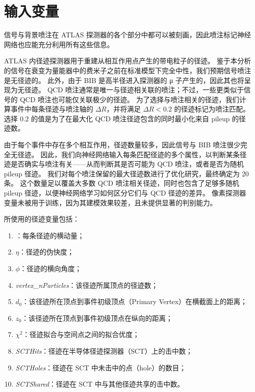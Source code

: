 \section{输入变量}
\label{cpm:NN_variables}

信号与背景喷注在 ATLAS 探测器的各个部分中都可以被刻画，因此喷注标记神经网络也应能充分利用所有这些信息。

ATLAS 内径迹探测器用于重建从相互作用点产生的带电粒子的径迹。
鉴于本分析的信号在衰变为量能器中的费米子之前在标准模型下完全中性，我们预期信号喷注是无径迹的。
此外，由于 BIB 是高半径进入探测器的 μ 子产生的，因此其也将呈现为无径迹。
QCD 喷注通常是唯一与径迹相关联的喷注；不过，一些更类似于信号的 QCD 喷注也可能仅关联极少的径迹。
为了选择与喷注相关的径迹，我们计算事件中每条径迹与喷注轴的 $\Delta R$，并将满足 $\Delta R < 0.2$ 的径迹标记为喷注匹配。
选择 $0.2$ 的值是为了在最大化 QCD 喷注径迹包含的同时最小化来自 pileup 的径迹数。

由于每个事件中存在多个相互作用，径迹数量较多，因此信号与 BIB 喷注很少完全无径迹。
因此，我们向神经网络输入每条匹配径迹的多个属性，以判断某条径迹是否确实与喷注有关——从而判断其是否可能为 QCD 喷注，或者是否为随机 pileup 径迹。
我们对每个喷注保留的最大径迹数进行了优化研究，最终确定为 20 条。
这个数量足以覆盖大多数 QCD 喷注相关径迹，同时也包含了足够多随机 pileup 径迹，以便神经网络学习如何区分它们与 QCD 径迹的差异。
像素探测器变量未被用于训练，因为其建模效果较差，且未提供显著的判别能力。

所使用的径迹变量包括：
\begin{enumerate}
      \item \pt：每条径迹的横动量；
      \item $\eta$：径迹的伪快度；
      \item $\phi$：径迹的横向角度；
      \item \textit{vertex\_nParticles}：该径迹所属顶点的径迹数；
      \item $d_0$：该径迹所在顶点到事件初级顶点（Primary Vertex）在横截面上的距离；
      \item $z_0$：该径迹所在顶点到事件初级顶点在纵向的距离；
      \item $\chi^2$：径迹拟合与空间点之间的拟合优度；
      \item \textit{SCTHits}：径迹在半导体径迹探测器（SCT）上的击中数；
      \item \textit{SCTHoles}：径迹在 SCT 中未击中的点（hole）的数目；
      \item \textit{SCTShared}：径迹在 SCT 中与其他径迹共享的击中数。
\end{enumerate}

